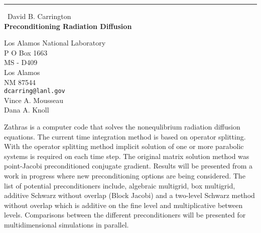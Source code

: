 \documentclass{report}
\begin{document}
\begin{center}
\rule{6in}{1pt} \
{\large David B. Carrington \\
{\bf Preconditioning Radiation Diffusion}}

Los Alamos National Laboratory \\ P O Box 1663 \\ MS - D409 \\ Los Alamos \\ NM 87544
\\
{\tt dcarring@lanl.gov}\\
Vince A. Mousseau\\
Dana A. Knoll\end{center}

Zathras is a computer code that solves the nonequlibrium radiation
diffusion equations. The current time integration method is based on
operator splitting. With the operator splitting method implicit solution
of one or more parabolic systems is required on each time step. The
original matrix solution method was point-Jacobi preconditioned conjugate
gradient. Results will be presented from a work in progress where new
preconditioning options are being considered. The list of potential
preconditioners include, algebraic multigrid, box multigrid, additive
Schwarz
without overlap (Block Jacobi) and a two-level Schwarz method without
overlap which is additive on the fine level and multiplicative between
levels. Comparisons between the different preconditioners will be
presented for multidimensional simulations in parallel.
\end{document}
